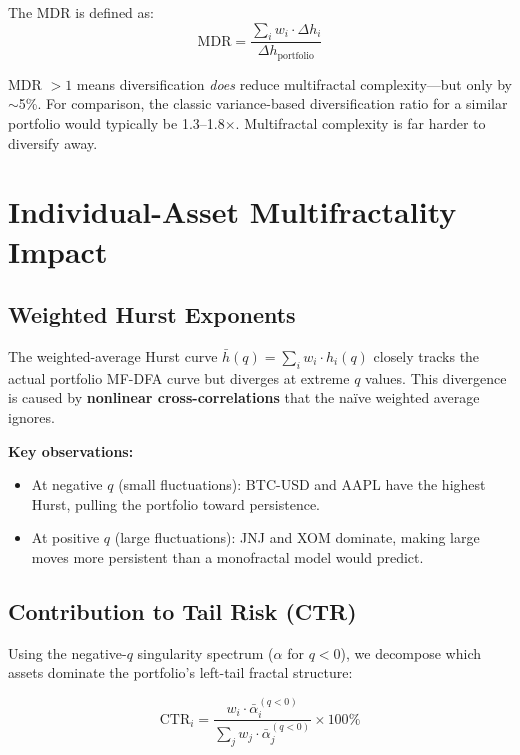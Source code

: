 \documentclass[11pt,a4paper]{article}
\begin{document}
The MDR is defined as:
\[
\text{MDR} = \frac{\sum_i w_i \cdot \Delta h_i}{\Delta h_{\text{portfolio}}}
\]

\begin{notebox}
MDR $> 1$ means diversification \emph{does} reduce multifractal complexity---but only by $\sim$5\%. For comparison, the classic variance-based diversification ratio for a similar portfolio would typically be 1.3--1.8$\times$. Multifractal complexity is far harder to diversify away.
\end{notebox}

\section{Individual-Asset Multifractality Impact}

\subsection{Weighted Hurst Exponents}

The weighted-average Hurst curve $\bar{h}(q) = \sum_i w_i \cdot h_i(q)$ closely tracks the actual portfolio MF-DFA curve but diverges at extreme $q$ values. This divergence is caused by \textbf{nonlinear cross-correlations} that the na\"ive weighted average ignores.

\textbf{Key observations:}
\begin{itemize}[nosep]
\item At negative $q$ (small fluctuations): BTC-USD and AAPL have the highest Hurst, pulling the portfolio toward persistence.
\item At positive $q$ (large fluctuations): JNJ and XOM dominate, making large moves more persistent than a monofractal model would predict.
\end{itemize}

\subsection{Contribution to Tail Risk (CTR)}

Using the negative-$q$ singularity spectrum ($\alpha$ for $q < 0$), we decompose which assets dominate the portfolio's left-tail fractal structure:

\[
\text{CTR}_i = \frac{w_i \cdot \bar{\alpha}_i^{(q<0)}}{\sum_j w_j \cdot \bar{\alpha}_j^{(q<0)}} \times 100\%
\]
\end{document}
